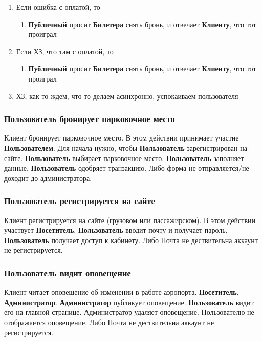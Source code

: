 \begin{enumerate}
    \item Если ошибка с оплатой, то
    \begin{enumerate}
        \item \textbf{Публичный} просит \textbf{Билетера} 
              снять бронь, и отвечает \textbf{Клиенту}, 
              что тот проиграл
    \end{enumerate}
    \item Если ХЗ, что там с оплатой, то
    \begin{enumerate}
        \item \textbf{Публичный} просит \textbf{Билетера} 
              снять бронь, и отвечает \textbf{Клиенту}, 
              что тот проиграл
    \end{enumerate}
    \item ХЗ, как-то ждем, что-то делаем асинхронно, 
          успокаиваем пользователя
\end{enumerate}

\subsubsection{Пользователь бронирует парковочное место}
Клиент бронирует парковочное место. В этом действии
принимает участие \textbf{Пользователем}. Для начала
нужно, чтобы \textbf{Пользователь} зарегистрирован на 
сайте. \textbf{Пользователь} выбирает парковочное место. 
\textbf{Пользователь} заполняет данные. \textbf{Пользователь} 
одобряет транзакцию. Либо форма не отправляется/не доходит
до администратора.

\subsubsection{Пользователь регистрируется на сайте}
Клиент регистрируется на сайте (грузовом или пассажирском).
В этом действии участвует \textbf{Посетитель}. 
\textbf{Пользователь} вводит почту и получает пароль, 
\textbf{Пользователь} получает доступ к кабинету.
Либо Почта не дествительна аккаунт не регистрируется.

\subsubsection{Пользователь видит оповещение}
Клиент читает оповещение об изменении в работе аэропорта.
\textbf{Посетитель}, \textbf{Администратор}. 
\textbf{Администратор} публикует оповещение. 
\textbf{Пользователь} видит его на главной странице.
Администратор удаляет оповещение. Пользователю не 
отображается оповещение. Либо Почта не дествительна
аккаунт не регистрируется.

